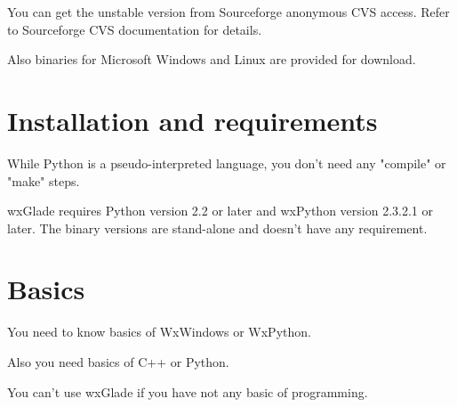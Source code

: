 \documentclass[a4paper,10pt]{book}
\begin{document}
                                
                                You can get the unstable version from Sourceforge anonymous CVS
                                 access. Refer to Sourceforge CVS documentation for details.
                                
                                
                                Also binaries for Microsoft Windows and Linux are provided for
                                 download.
                                
\section{Installation and requirements}
                                    
                                    
                                    While Python is a pseudo-interpreted language, you don't need
                                     any "compile" or "make" steps.
                                    
                                    
                                    wxGlade requires Python version 2.2 or later and wxPython version
                                      2.3.2.1 or later.
                                    The binary versions are stand-alone and doesn't have any requirement.
\section{Basics}
                                        
                                        
                                        You need to know basics of WxWindows or WxPython. 
                                        
                                        
                                        
                                        
                                        Also you need basics of C++ or Python.
                                        
                                        
                                        
                                        
                                        You can't use wxGlade if you have not any basic of programming.
                                        
                                        
                                        
\end{document}
